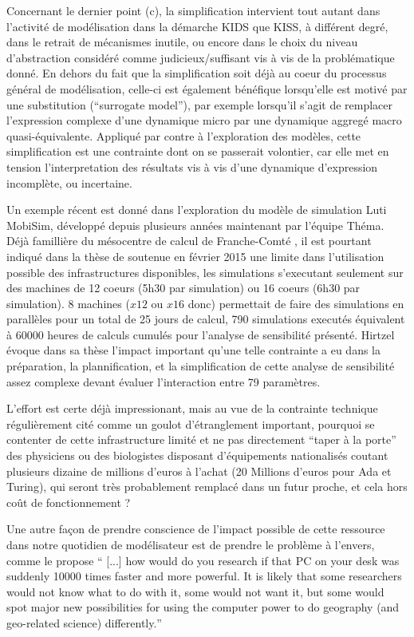 Concernant le dernier point (c), la simplification intervient tout autant dans l'activité de modélisation dans la démarche KIDS que KISS, à différent degré, dans le retrait de mécanismes inutile, ou encore dans le choix du niveau d'abstraction considéré comme judicieux/suffisant vis à vis de la problématique donné. En dehors du fait que la simplification soit déjà au coeur du processus général de modélisation, celle-ci est également bénéfique lorsqu'elle est motivé par une substitution (\enquote{surrogate model}), par exemple lorsqu'il s'agit de remplacer l'expression complexe d'une dynamique micro par une dynamique aggregé macro quasi-équivalente. Appliqué par contre à l'exploration des modèles, cette simplification est une contrainte dont on se passerait volontier, car elle met en tension l'interpretation des résultats vis à vis d'une dynamique d'expression incomplète, ou incertaine.

Un exemple récent est donné dans l'exploration du modèle de simulation Luti MobiSim, développé depuis plusieurs années maintenant par l'équipe Théma. Déjà famillière du mésocentre de calcul de Franche-Comté \autocite{Asch2012}, il est pourtant indiqué dans la thèse de \textcite{Hirtzel2015} soutenue en février 2015 une limite dans l'utilisation possible des infrastructures disponibles, les simulations s'executant seulement sur des machines de 12 coeurs (5h30 par simulation) ou 16 coeurs (6h30 par simulation). 8 machines ($ x 12$ ou $ x 16$ donc) permettait de faire des simulations en parallèles pour un total de 25 jours de calcul, 790 simulations executés équivalent à 60000 heures de calculs cumulés pour l'analyse de sensibilité présenté. Hirtzel évoque dans sa thèse l'impact important qu'une telle contrainte a eu dans la préparation, la plannification, et la simplification de cette analyse de sensibilité assez complexe devant évaluer l'interaction entre 79 paramètres. 

L'effort est certe déjà impressionant, mais au vue de la contrainte technique régulièrement cité comme un goulot d'étranglement important, pourquoi se contenter de cette infrastructure limité et ne pas directement \enquote{taper à la porte} des physiciens ou des biologistes disposant d'équipements nationalisés coutant plusieurs dizaine de millions d'euros à l'achat (20 Millions d'euros pour Ada et Turing), qui seront très probablement remplacé dans un futur proche, et cela hors coût de fonctionnement ? 

Une autre façon de prendre conscience de l'impact possible de cette ressource dans notre quotidien de modélisateur est de prendre le problème à l'envers, comme le propose \textcite{Openshaw2000}  \foreignquote{english}{ [...] how would do you research if that PC on your desk was suddenly 10000 times faster and more powerful. It is likely that some researchers would not know what to do with it, some would not want it, but some would spot major new possibilities for using the computer power to do geography (and geo-related science) differently.}

